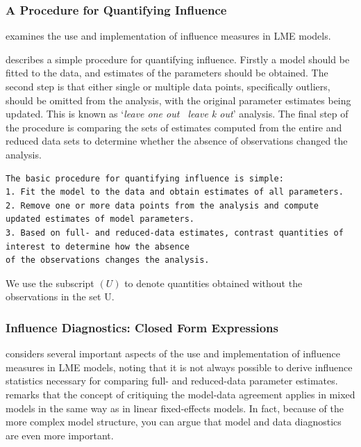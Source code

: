 \documentclass[12pt, a4paper]{report}
\theoremstyle{plain}
\theoremstyle{definition}
\theoremstyle{remark}
\begin{document}
	
	\subsubsection{A Procedure for Quantifying Influence}  %
\citet{schabenberger} examines the use and implementation of influence measures in LME models.

	\citet{schabenberger} describes a simple procedure for quantifying influence. Firstly a model should be fitted to the data, and
	estimates of the parameters should be obtained. The second step is that either single or multiple data points, specifically outliers,
	should be omitted from the analysis, with the original parameter estimates being updated. This is known as `\textit{leave one out \ leave k out}' analysis. The final step of the procedure is comparing the sets of estimates computed from the entire and reduced data sets to determine whether the absence of observations changed the
	analysis.

\begin{verbatim}
The basic procedure for quantifying influence is simple:
1. Fit the model to the data and obtain estimates of all parameters.
2. Remove one or more data points from the analysis and compute updated estimates of model parameters.
3. Based on full- and reduced-data estimates, contrast quantities of interest to determine how the absence
of the observations changes the analysis.
\end{verbatim}

We use the subscript $(U)$ to denote quantities obtained without the observations in the set U. 
	
\subsubsection{Influence Diagnostics: Closed Form Expressions} %
	
	\citet{schabenberger} considers several important aspects of the use and implementation of influence measures in LME models, noting that it is not always possible to
	derive influence statistics necessary for comparing full- and reduced-data parameter estimates. 
			\citet{schabenberger} remarks that the concept of critiquing the model-data agreement applies in mixed models in the same way as in linear
	fixed-effects models. In fact, because of the more complex model structure, you can argue that model and
	data diagnostics are even more important.
	
\end{document}
